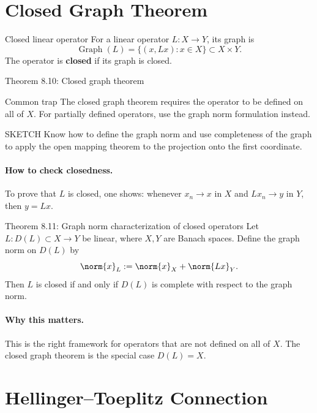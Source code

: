 \documentclass[header={Lecture 6 Exam Study Notes}]{study-note}
\begin{document}
\section{Closed Graph Theorem}

\begin{defbox}{Closed linear operator}
For a linear operator $L:X\to Y$, its graph is
\[
\operatorname{Graph}(L)=\{(x,Lx):x\in X\}\subset X\times Y.
\]
The operator is \textbf{closed} if its graph is closed.
\end{defbox}

\begin{thmbox}{Theorem 8.10: Closed graph theorem}
\thmClosedGraph
\end{thmbox}

\begin{warningbox}{Common trap}
The closed graph theorem requires the operator to be defined on all of $X$. For partially defined operators, use the graph norm formulation instead.
\end{warningbox}

\begin{prooflevelbox}{SKETCH}
Know how to define the graph norm and use completeness of the graph to apply the open mapping theorem to the projection onto the first coordinate.
\end{prooflevelbox}

\paragraph{How to check closedness.}
To prove that $L$ is closed, one shows:
whenever $x_n\to x$ in $X$ and $Lx_n\to y$ in $Y$, then $y=Lx$.

\begin{thmbox}{Theorem 8.11: Graph norm characterization of closed operators}
Let $L:D(L)\subset X\to Y$ be linear, where $X,Y$ are Banach spaces. Define the graph norm on $D(L)$ by
\[
\norm{x}_{L}:=\norm{x}_X+\norm{Lx}_Y.
\]
Then $L$ is closed if and only if $D(L)$ is complete with respect to the graph norm.
\end{thmbox}

\paragraph{Why this matters.}
This is the right framework for operators that are not defined on all of $X$. The closed graph theorem is the special case $D(L)=X$.

\section{Hellinger--Toeplitz Connection}
\end{document}
